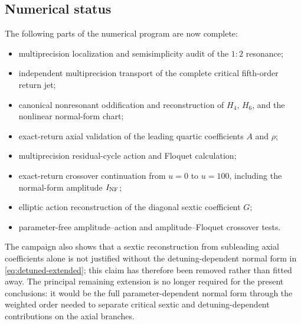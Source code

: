 \subsection{Numerical status}

The following parts of the numerical program are now complete:
\begin{itemize}[leftmargin=2em]
\item multiprecision localization and semisimplicity audit of the $1{:}2$ resonance;
\item independent multiprecision transport of the complete critical fifth-order return jet;
\item canonical nonresonant oddification and reconstruction of $H_4$, $H_6$, and the nonlinear normal-form chart;
\item exact-return axial validation of the leading quartic coefficients $A$ and $\rho$;
\item multiprecision residual-cycle action and Floquet calculation;
\item exact-return crossover continuation from $u=0$ to $u=100$, including the normal-form amplitude $I_{\rm NF}$;
\item elliptic action reconstruction of the diagonal sextic coefficient $G$;
\item parameter-free amplitude--action and amplitude--Floquet crossover tests.
\end{itemize}

The campaign also shows that a sextic reconstruction from subleading axial coefficients alone is not justified without the detuning-dependent normal form in \eqref{eq:detuned-extended}; this claim has therefore been removed rather than fitted away.  The principal remaining extension is no longer required for the present conclusions: it would be the full parameter-dependent normal form through the weighted order needed to separate critical sextic and detuning-dependent contributions on the axial branches.
